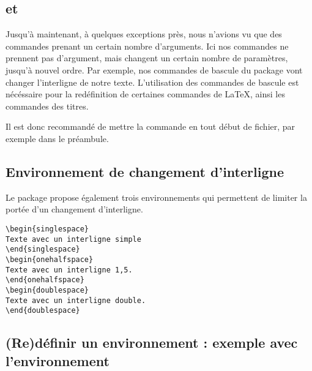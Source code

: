 \subsection{ et }\label{bascule}

Jusqu'à maintenant, à quelques exceptions près, nous n'avions vu que des commandes prenant un certain nombre d'arguments. Ici nos commandes ne prennent pas d'argument, mais changent un certain nombre de paramètres, jusqu'à nouvel ordre. Par exemple, nos commandes de bascule du package  vont changer l'interligne de notre texte. L'utilisation des commandes de bascule est nécéssaire pour la redéfinition de certaines commandes de \LaTeX, ainsi les commandes des titres.

Il est donc recommandé de mettre la commande  en tout début de fichier, par exemple dans le préambule.

\subsection{Environnement de changement d'interligne}

Le package  propose également trois environnements qui permettent de limiter la portée d'un changement d'interligne. 

\begin{verbatim}
\begin{singlespace}
Texte avec un interligne simple
\end{singlespace}
\begin{onehalfspace}
Texte avec un interligne 1,5.
\end{onehalfspace}
\begin{doublespace}
Texte avec un interligne double.
\end{doublespace}
\end{verbatim}

\subsection[Rédéfinir un environnement : quotation]{(Re)définir un environnement : exemple avec l'environnement }




